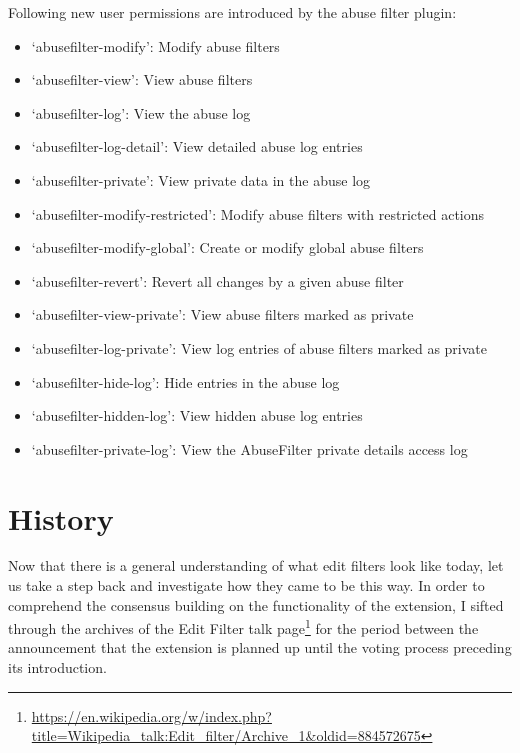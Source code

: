 Following new user permissions are introduced by the abuse filter plugin:
\begin{itemize}
    \item `abusefilter-modify': Modify abuse filters
    \item `abusefilter-view': View abuse filters
    \item `abusefilter-log': View the abuse log
    \item `abusefilter-log-detail':	View detailed abuse log entries
    \item `abusefilter-private': View private data in the abuse log
    \item `abusefilter-modify-restricted': Modify abuse filters with restricted actions
    \item `abusefilter-modify-global': Create or modify global abuse filters
    \item `abusefilter-revert':	Revert all changes by a given abuse filter
    \item `abusefilter-view-private': View abuse filters marked as private
    \item `abusefilter-log-private': View log entries of abuse filters marked as private
    \item `abusefilter-hide-log': Hide entries in the abuse log
    \item `abusefilter-hidden-log':	View hidden abuse log entries
    \item `abusefilter-private-log': View the AbuseFilter private details access log
\end{itemize}




\section{History}

Now that there is a general understanding of what edit filters look like today, let us take a step back and investigate how they came to be this way.
In order to comprehend the consensus building on the functionality of the extension, I sifted through the archives of the Edit Filter talk page\footnote{\url{https://en.wikipedia.org/w/index.php?title=Wikipedia_talk:Edit_filter/Archive_1&oldid=884572675}}
for the period between the announcement that the extension is planned up until the voting process preceding its introduction.

